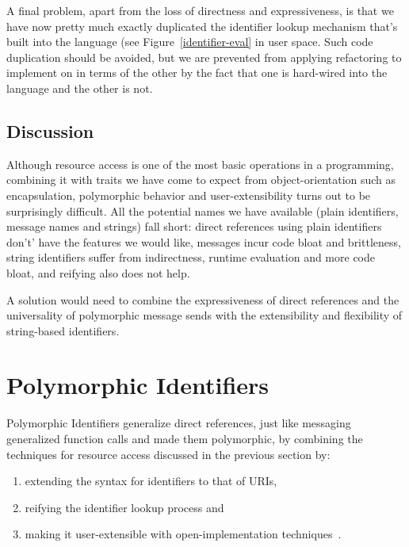 \documentclass[preprint,authoryear]{llncs}
\begin{document}
A final problem, apart from the loss of directness and expressiveness, is that we have now pretty
much exactly duplicated the identifier lookup mechanism that's built into the language (see Figure~\ref{identifier-eval}
in user space.  Such code duplication should be avoided, but we are prevented from applying refactoring
to implement on in terms of the other by the fact that one is hard-wired into the language and the other is not.

\subsection{Discussion}

Although resource access is one of the most basic operations in a programming, combining it
with traits we have come to expect from object-orientation such as encapsulation, polymorphic
behavior and user-extensibility turns out to be surprisingly difficult.   All the potential names
we have available (plain identifiers, message names and strings) fall short:  direct references
using plain identifiers don't' have the features we would like, messages incur code bloat
and brittleness, string identifiers suffer from indirectness, runtime evaluation and more
code bloat, and reifying also does not help.

A solution would need to combine the expressiveness of direct references and the universality
of polymorphic message sends with the extensibility and flexibility of string-based identifiers.



\section{Polymorphic Identifiers}
\label{polymorphic-identifiers}

Polymorphic Identifiers
generalize direct references,  just like messaging generalized function calls and made them polymorphic,
by combining the techniques for resource access discussed in the previous 
section by:
\begin{enumerate}
\item extending the syntax for identifiers to that of URIs,
\item reifying the identifier lookup process and
\item making it user-extensible with open-implementation techniques~\cite{OpenImplementations}.
\end{enumerate}
\end{document}
